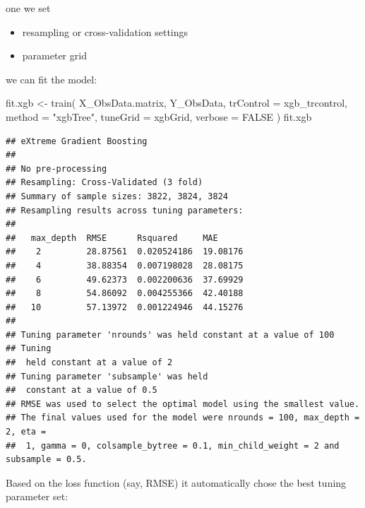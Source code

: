 \documentclass[
]{book}
\newenvironment{Shaded}{\begin{snugshade}}{\end{snugshade}}
\newcommand{\AttributeTok}[1]{\textcolor[rgb]{0.77,0.63,0.00}{#1}}
\newcommand{\ConstantTok}[1]{\textcolor[rgb]{0.00,0.00,0.00}{#1}}
\newcommand{\FunctionTok}[1]{\textcolor[rgb]{0.00,0.00,0.00}{#1}}
\newcommand{\NormalTok}[1]{#1}
\newcommand{\OtherTok}[1]{\textcolor[rgb]{0.56,0.35,0.01}{#1}}
\newcommand{\SpecialCharTok}[1]{\textcolor[rgb]{0.00,0.00,0.00}{#1}}
\newcommand{\StringTok}[1]{\textcolor[rgb]{0.31,0.60,0.02}{#1}}
\providecommand{\tightlist}{%
  \setlength{\itemsep}{0pt}\setlength{\parskip}{0pt}}
\begin{document}
one we set

\begin{itemize}
\tightlist
\item
  resampling or cross-validation settings
\item
  parameter grid
\end{itemize}

we can fit the model:

\begin{Shaded}
\begin{Highlighting}[]
\NormalTok{fit.xgb }\OtherTok{\textless{}{-}} \FunctionTok{train}\NormalTok{(}
\NormalTok{  X\_ObsData.matrix, Y\_ObsData,  }
  \AttributeTok{trControl =}\NormalTok{ xgb\_trcontrol,}
  \AttributeTok{method =} \StringTok{"xgbTree"}\NormalTok{,}
  \AttributeTok{tuneGrid =}\NormalTok{ xgbGrid,}
  \AttributeTok{verbose =} \ConstantTok{FALSE}
\NormalTok{)}
\NormalTok{fit.xgb}
\end{Highlighting}
\end{Shaded}

\begin{verbatim}
## eXtreme Gradient Boosting 
## 
## No pre-processing
## Resampling: Cross-Validated (3 fold) 
## Summary of sample sizes: 3822, 3824, 3824 
## Resampling results across tuning parameters:
## 
##   max_depth  RMSE      Rsquared     MAE     
##    2         28.87561  0.020524186  19.08176
##    4         38.88354  0.007198028  28.08175
##    6         49.62373  0.002200636  37.69929
##    8         54.86092  0.004255366  42.40188
##   10         57.13972  0.001224946  44.15276
## 
## Tuning parameter 'nrounds' was held constant at a value of 100
## Tuning
##  held constant at a value of 2
## Tuning parameter 'subsample' was held
##  constant at a value of 0.5
## RMSE was used to select the optimal model using the smallest value.
## The final values used for the model were nrounds = 100, max_depth = 2, eta =
##  1, gamma = 0, colsample_bytree = 0.1, min_child_weight = 2 and subsample = 0.5.
\end{verbatim}

Based on the loss function (say, RMSE) it automatically chose the best tuning parameter set:

\begin{Shaded}
\end{Shaded}
\end{document}
